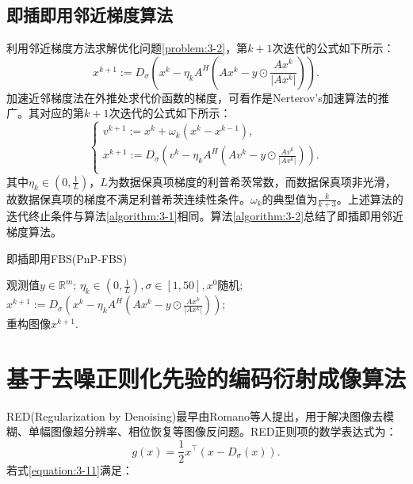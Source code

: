 \subsection{即插即用邻近梯度算法}
利用邻近梯度方法求解优化问题\eqref{problem:3-2}，第$k+1$次迭代的公式如下所示：
\begin{equation} \label{equation:3-9}
	x^{k+1}:=D_{\sigma}\left(x^k-\eta_k{A^{\mathit{H}}\left({Ax^k-y\odot{\frac{Ax^k}{\vert{Ax^k}\vert}}}\right)}\right).
\end{equation}
加速近邻梯度法在外推处求代价函数的梯度，可看作是Nerterov's加速算法的推广。其对应的第$k+1$次迭代的公式如下所示：
\begin{equation} \label{equation:3-10}
	\begin{cases}
		v^{k+1}:=x^k+\omega_k(x^k-x^{k-1}), \\
		x^{k+1} := D_{\sigma}\left(v^k-\eta_k{A^{\mathit{H}}\left({Av^k-y\odot{\frac{Av^k}{\vert{Av^k}\vert}}}\right)}\right). \\
	\end{cases}
\end{equation}
其中$\eta_k\in(0,\frac{1}{L})$，$L$为数据保真项梯度的利普希茨常数，而数据保真项非光滑，故数据保真项的梯度不满足利普希茨连续性条件。$\omega_k$的典型值为$\frac{k}{k+3}$。上述算法的迭代终止条件与算法\ref{algorithm:3-1}相同。算法\ref{algorithm:3-2}总结了即插即用邻近梯度算法。
\begin{algorithm}[!htbp]
	\caption{即插即用FBS(PnP-FBS)}
	\label{algorithm:3-2}
	\begin{algorithmic}[1]
		\REQUIRE	观测值$y\in \mathbb{R}^m$;	%
		\ENSURE		%
		$\eta_k\in(0,\frac{1}{L}),\sigma\in[1,50],x^0$随机; \\
		\STATE $x^{k+1}:=D_{\sigma}\left(x^k-\eta_k{A^{\mathit{H}}\left({Ax^k-y\odot{\frac{Ax^k}{\vert{Ax^k}\vert}}}\right)}\right)$;\\ %
		\ENDWHILE
		\RETURN 重构图像$x^{k+1}$. %
	\end{algorithmic}
\end{algorithm}

\section{基于去噪正则化先验的编码衍射成像算法}
RED(Regularization by Denoising)最早由Romano等人提出\supercite{Romano,Hong,Zihui}，用于解决图像去模糊、单幅图像超分辨率、相位恢复等图像反问题。RED正则项的数学表达式为：
\begin{equation} \label{equation:3-11}
	g(x)=\frac{1}{2}x^\top(x-D_{\sigma}(x)).
\end{equation}
若式\eqref{equation:3-11}满足：


